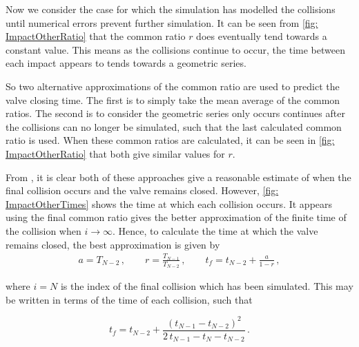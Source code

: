 Now we consider the case for which the simulation has modelled the collisions until numerical errors prevent further simulation. It can be seen from \cref{fig: ImpactOtherRatio} that the common ratio $r$ does eventually tend towards a constant value. This means as the collisions continue to occur, the time between each impact appears to tends towards a geometric series. 

So two alternative approximations of the common ratio are used to predict the valve closing time. The first is to simply take the mean average of the common ratios. The second is to consider the geometric series only occurs continues after the collisions can no longer be simulated, such that the last calculated common ratio is used.%
When these common ratios are calculated, it can be seen in \cref{fig: ImpactOtherRatio} that both give similar values for $r$.

From , it is clear both of these approaches give a reasonable estimate of when the final collision occurs and the valve remains closed. However, \cref{fig: ImpactOtherTimes} shows the time at which each collision occurs. It appears using the final common ratio gives the better approximation of the finite time of the collision when $i \rightarrow \infty$. Hence, to calculate the time at which the valve remains closed, the best approximation is given by
~
\begin{equation*}
\begin{split}
    a = T_{N-2} \, , \qquad %
    r = \frac{T_{N-1}}{T_{N-2}} \, , \qquad %
    t_f = t_{N-2} + \frac{a}{1-r} \, ,
\end{split}
\end{equation*}

where $i = N$ is the index of the final collision which has been simulated. This may be written in terms of the time of each collision, such that

\begin{equation*}
    t_f = t_{N-2} + \frac{\left( t_{N-1} - t_{N-2} \right)^2}{2 \, t_{N-1} - t_N - t_{N-2}} \, .
\end{equation*}